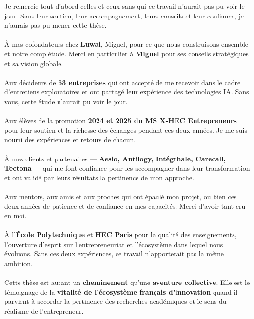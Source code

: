 Je remercie tout d’abord celles et ceux sans qui ce travail n’aurait pas pu voir le jour. Sans leur soutien, leur accompagnement, leurs conseils et leur confiance, je n’aurais pas pu mener cette thèse.
\\\\
À mes cofondateurs chez \textbf{Luwai}, Miguel, pour ce que nous construisons ensemble et notre complétude. Merci en particulier à \textbf{Miguel} pour ses conseils stratégiques et sa vision globale.
\\\\
Aux décideurs de \textbf{63 entreprises} qui ont accepté de me recevoir dans le cadre d’entretiens exploratoires et ont partagé leur expérience des technologies IA. Sans vous, cette étude n’aurait pu voir le jour.
\\\\
Aux élèves de la promotion \textbf{2024 et 2025 du MS X-HEC Entrepreneurs} pour leur soutien et la richesse des échanges pendant ces deux années. Je me suis nourri des expériences et retours de chacun.
\\\\
À mes clients et partenaires — \textbf{Aesio, Antilogy, Intégrhale, Carecall, Tectona} — qui me font confiance pour les accompagner dans leur transformation et ont validé par leurs résultats la pertinence de mon approche.
\\\\
Aux mentors, aux amis et aux proches qui ont épaulé mon projet, ou bien ces deux années de patience et de confiance en mes capacités. Merci d’avoir tant cru en moi.
\\\\
À l’\textbf{École Polytechnique} et \textbf{HEC Paris} pour la qualité des enseignements, l’ouverture d’esprit sur l’entrepreneuriat et l’écosystème dans lequel nous évoluons. Sans ces deux expériences, ce travail n’apporterait pas la même ambition.
\\\\
Cette thèse est autant un \textbf{cheminement} qu’une \textbf{aventure collective}. Elle est le témoignage de la \textbf{vitalité de l’écosystème français d’innovation} quand il parvient à accorder la pertinence des recherches académiques et le sens du réalisme de l’entrepreneur.